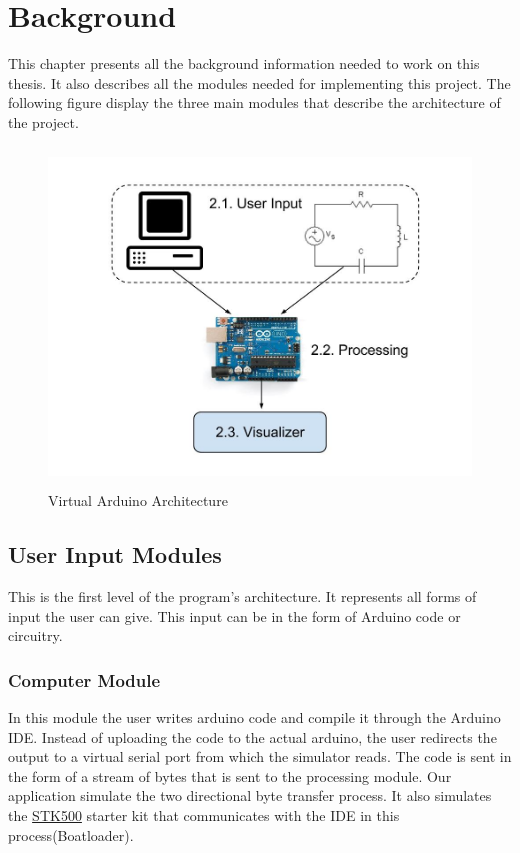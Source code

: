 \chapter{Background}\label{chap:background}

This chapter presents all the background information needed to work on this thesis. It also describes all the modules needed for implementing this project. The following figure 
display the three main modules that describe the architecture of the project.

\begin{figure}[h!]
\centering
\includegraphics[height=9cm, width=12cm]{Architecture.jpg}
\caption{Virtual Arduino Architecture}
\label{Architecture}
\end{figure}

\section{User Input Modules}
This is the first level of the program’s architecture. It represents all forms of input the user can give. This input can be in the form of Arduino code or circuitry.

\subsection{Computer Module}
In this module the user writes arduino code and compile it through the Arduino IDE. Instead of uploading the code to the actual arduino, the user redirects the output to a virtual serial port from which the simulator reads. The code is sent in the form of a stream of bytes that is sent to the processing module. Our application simulate the two directional byte transfer process. It also simulates the \href{http://www.atmel.com/tools/STK500.aspx?tab=overview}{STK500} starter kit that communicates with the IDE in this process(Boatloader).

